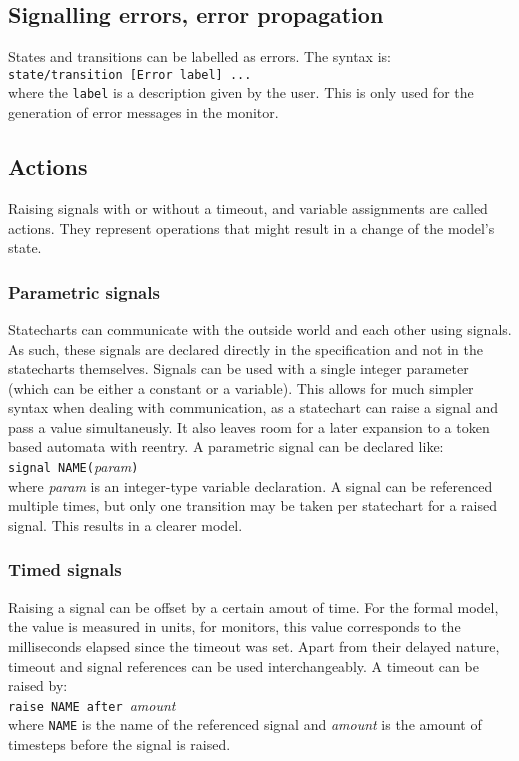   \subsection{Signalling errors, error propagation}
States and transitions can be labelled as errors. The syntax is: \\\verb!state/transition [Error label] ...!\\ where the \verb!label! is a description given by the user. This is only used for the generation of error messages in the monitor.
  \subsection{Actions}
Raising signals with or without a timeout, and variable assignments are called actions. They represent operations that might result in a change of the model's state.
  \subsubsection{Parametric signals}
Statecharts can communicate with the outside world and each other using signals. As such, these signals are declared directly in the specification and not in the statecharts themselves. Signals can be used with a single integer parameter (which can be either a constant or a variable). This allows for much simpler syntax when dealing with communication, as a statechart can raise a signal and pass a value simultaneusly. It also leaves room for a later expansion to a token based automata with reentry.
A parametric signal can be declared like: \\\verb!signal NAME(!\textit{param}\verb!)!\\ where \textit{param} is an integer-type variable declaration. A signal can be referenced multiple times, but only one transition may be taken per statechart for a raised signal. This results in a clearer model.
  \subsubsection{Timed signals}
Raising a signal can be offset by a certain amout of time. For the formal model, the value is measured in units, for monitors, this value corresponds to the milliseconds elapsed since the timeout was set. Apart from their delayed nature, timeout and signal references can be used interchangeably. A timeout can be raised by: \\\verb!raise NAME after !\textit{amount}\\ where \verb!NAME! is the name of the referenced signal and \textit{amount} is the amount of timesteps before the signal is raised.
